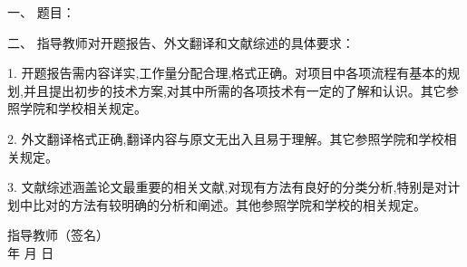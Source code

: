 \newpage

\thispagestyle{empty}

\vspace*{0.7em}

{
\setlength{\parindent}{0em}
\renewcommand{\baselinestretch}{2}
\songti\sihao\bfseries

一、 \; 题目： \; \underline{\makebox[24em]{\zjutitlec}}

\vspace{2em}

二、 \; 指导教师对开题报告、外文翻译和文献综述的具体要求：

1. \; 开题报告需内容详实,工作量分配合理,格式正确。对项目中各项流程有基本的规划,并且提出初步的技术方案,对其中所需的各项技术有一定的了解和认识。其它参照学院和学校相关规定。

2. \; 外文翻译格式正确,翻译内容与原文无出入且易于理解。其它参照学院和学校相关规定。

3. \; 文献综述涵盖论文最重要的相关文献,对现有方法有良好的分类分析,特别是对计划中比对的方法有较明确的分析和阐述。其他参照学院和学校的相关规定。

\vspace*{\fill}
}

{
\songti\xiaosi\bfseries
\begin{flushright}
  指导教师（签名） \; \underline{\hspace{6em}} \\
  年 \qquad 月 \qquad 日
\end{flushright}

\vspace{4cm}
}

